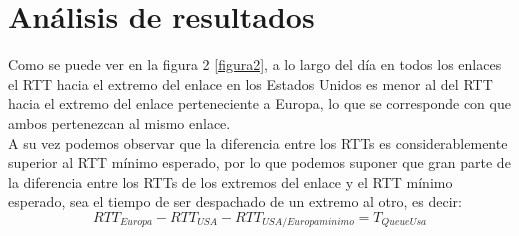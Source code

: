 \section{Análisis de resultados}

Como se puede ver en la figura 2 \ref{figura2}, a lo largo del día en todos los enlaces el RTT hacia el extremo del enlace en los Estados Unidos es menor al del RTT hacia el extremo del enlace perteneciente a Europa, lo que se corresponde con que ambos pertenezcan al mismo enlace.	\\
A su vez podemos observar que la diferencia entre los RTTs es considerablemente superior al RTT mínimo esperado, por lo que podemos suponer que gran parte de la diferencia entre los RTTs de los extremos del enlace y el RTT mínimo esperado, sea el tiempo de ser despachado de un extremo al otro, es decir:	\\
\begin{displaymath}
   RTT_{Europa} - RTT_{USA} - RTT_{USA/Europa minimo} = T_{Queue Usa}
\end{displaymath}
